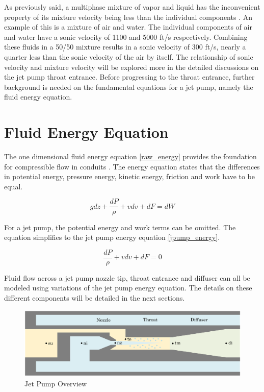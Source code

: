 \documentclass[12 pt]{report}
\begin{document}
As previously said, a multiphase mixture of vapor and liquid has the inconvenient property of its mixture velocity being less than the individual components \cite{himr}. An example of this is a mixture of air and water. The individual components of air and water have a sonic velocity of 1100 and 5000 ft/s respectively. Combining these fluids in a 50/50 mixture results in a sonic velocity of 300 ft/s, nearly a quarter less than the sonic velocity of the air by itself. The relationship of sonic velocity and mixture velocity will be explored more in the detailed discussions on the jet pump throat entrance. Before progressing to the throat entrance, further background is needed on the fundamental equations for a jet pump, namely the fluid energy equation.

\section{Fluid Energy Equation}

The one dimensional fluid energy equation \eqref{raw_energy} provides the foundation for compressible flow in conduits \cite{fluids_cheme}. The energy equation states that the differences in potential energy, pressure energy, kinetic energy, friction and work have to be equal.

\begin{equation}
gdz + \frac{dP}{\rho} + vdv + dF = dW
\label{raw_energy}
\end{equation}

For a jet pump, the potential energy and work terms can be omitted. The equation simplifies to the jet pump energy equation \eqref{jpump_energy}.

\begin{equation}
\frac{dP}{\rho} + vdv + dF = 0
\label{jpump_energy}
\end{equation}

Fluid flow across a jet pump nozzle tip, throat entrance and diffuser can all be modeled using variations of the jet pump energy equation. The details on these different components will be detailed in the next sections.

\begin{figure}
    \centering
    \includegraphics[width=1\linewidth]{figures/jp_over_v2.PNG}
    \caption{Jet Pump Overview}
    \label{fig:jetpump_side}
\end{figure}
\end{document}
